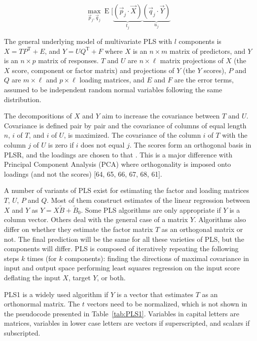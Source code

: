 \documentclass[preprint,12pt]{elsarticle}
\begin{document}
\begin{equation}
	\max_{{\vec{p}}_{j},{\vec{q}}_{j}}\operatorname{E} [\underbrace{({\vec{p}}_{j}\cdot {\vec{X}})}_{t_{j}}\underbrace{({\vec{q}}_{j}\cdot {\vec{Y}})}_{u_{j}}
	\label{eqn:14}
\end{equation}

The general underlying model of multivariate PLS with $l$ components is $X=TP^{\mathrm{T}}+E$, and $Y=UQ^{\mathrm{T}}+F$ where $X$ is an $n\times m$ matrix of predictors, and $Y$ is an $n\times p$ matrix of responses. $T$ and $U$ are $n\times \ell$ matrix projections of $X$ (the $X$ score, component or factor matrix) and projections of $Y$ (the $Y$ scores), $P$ and $Q$ are $m\times \ell $ and $p\times \ell $ loading matrices, and $E$ and $F$ are the error terms, assumed to be independent random normal variables following the same distribution.

The decompositions of $X$ and $Y$ aim to increase the covariance between $T$ and $U$. Covariance is defined pair by pair and the covariance of columns of equal length $n$, $i$ of $T$, and $i$ of $U$, is maximized. The covariance of the column $i$ of $T$ with the column $j$ of $U$ is zero if $i$ does not equal $j$.
The scores form an orthogonal basis in PLSR, and the loadings are chosen to that . This is a major difference with Principal Component Analysis (PCA) where orthogonality is imposed onto loadings (and not the scores) [64, 65, 66, 67, 68, 61].

A number of variants of PLS exist for estimating the factor and loading matrices $T$, $U$, $P$ and $Q$. Most of them construct estimates of the linear regression between $X$ and $Y$ as $Y=X{\tilde{B}}+{\tilde{B}}_{0}$. Some PLS algorithms are only appropriate if $Y$ is a column vector. Others deal with the general case of a matrix $Y$. Algorithms also differ on whether they estimate the factor matrix $T$ as an orthogonal matrix or not. The final prediction will be the same for all these varieties of PLS, but the components will differ.
PLS is composed of iteratively repeating the following steps $k$ times (for $k$ components):
finding the directions of maximal covariance in input and output space performing least squares regression on the input score deflating the input $X$, target $Y$, or both.

PLS1 is a widely used algorithm if $Y$ is a vector that estimates $T$ as an orthonormal matrix. The $t$ vectors need to be normalized, which is not shown in the pseudocode presented in Table~\ref{tab:PLS1}. Variables in capital letters are matrices, variables in lower case letters are vectors if superscripted, and scalars if subscripted.
\end{document}
